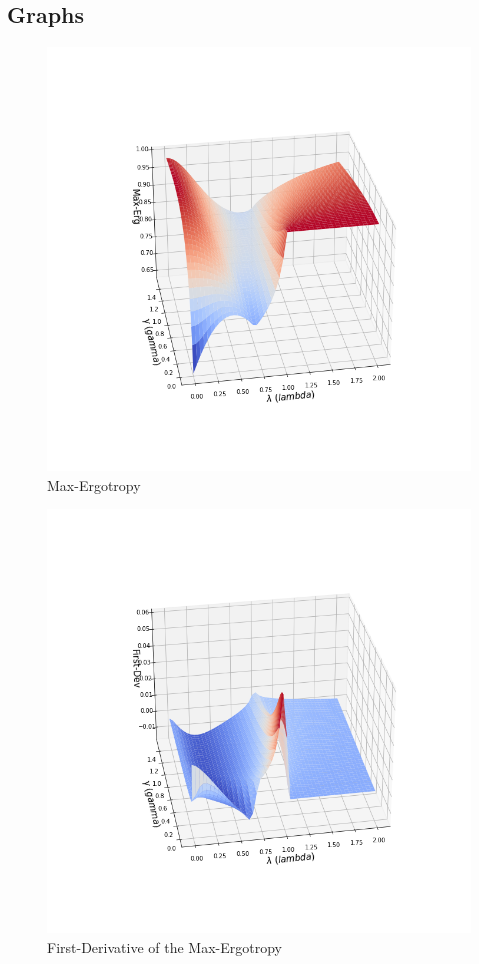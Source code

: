 \documentclass[12pt,a4paper]{book}
\theoremstyle{definition}
\begin{document}
\subsection{Graphs}



\begin{figure}[h]
	\centering
	\includegraphics[width=0.7\linewidth]{graphs/3dplotmaxerg}
	\caption{Max-Ergotropy}
	\label{fig:3dplotmaxerg}
\end{figure}
\begin{figure}[h]
	\centering
	\includegraphics[width=0.7\linewidth]{graphs/3dplotfirstdevmaxerg}
	\caption{First-Derivative of the Max-Ergotropy}
	\label{fig:3dplotfirstdevmaxerg}
\end{figure}
\end{document}
